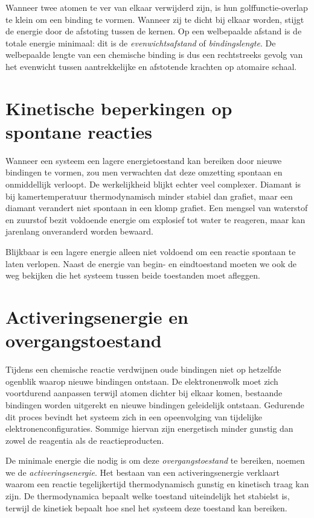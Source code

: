 Wanneer twee atomen te ver van elkaar verwijderd zijn, is hun golffunctie-overlap te klein om een binding te vormen. Wanneer zij te dicht bij elkaar worden, stijgt de energie door de afstoting tussen de kernen. Op een welbepaalde afstand is de totale energie minimaal: dit is de \emph{evenwichtsafstand} of \emph{bindingslengte}. De welbepaalde lengte van een chemische binding is dus een rechtstreeks gevolg van het evenwicht tussen aantrekkelijke en afstotende krachten op atomaire schaal.

\section{Kinetische beperkingen op spontane reacties}

Wanneer een systeem een lagere energietoestand kan bereiken door nieuwe bindingen te vormen, zou men verwachten dat deze omzetting spontaan en onmiddellijk verloopt. De werkelijkheid blijkt echter veel complexer. Diamant is bij kamertemperatuur thermodynamisch minder stabiel dan grafiet, maar een diamant verandert niet spontaan in een klomp grafiet. Een mengsel van waterstof en zuurstof bezit voldoende energie om explosief tot water te reageren, maar kan jarenlang onveranderd worden bewaard.

Blijkbaar is een lagere energie alleen niet voldoend om een reactie spontaan te laten verlopen. Naast de energie van begin- en eindtoestand moeten we ook de weg bekijken die het systeem tussen beide toestanden moet afleggen.

\section{Activeringsenergie en overgangstoestand}

Tijdens een chemische reactie verdwijnen oude bindingen niet op hetzelfde ogenblik waarop nieuwe bindingen ontstaan. De elektronenwolk moet zich voortdurend aanpassen terwijl atomen dichter bij elkaar komen, bestaande bindingen worden uitgerekt en nieuwe bindingen geleidelijk ontstaan. Gedurende dit proces bevindt het systeem zich in een opeenvolging van tijdelijke elektronenconfiguraties. Sommige hiervan zijn energetisch minder gunstig dan zowel de reagentia als de reactieproducten.

De minimale energie die nodig is om deze \emph{overgangstoestand} te bereiken, noemen we de \emph{activeringsenergie}. Het bestaan van een activeringsenergie verklaart waarom een reactie tegelijkertijd thermodynamisch gunstig en kinetisch traag kan zijn. De thermodynamica bepaalt welke toestand uiteindelijk het stabielst is, terwijl de kinetiek bepaalt hoe snel het systeem deze toestand kan bereiken.

